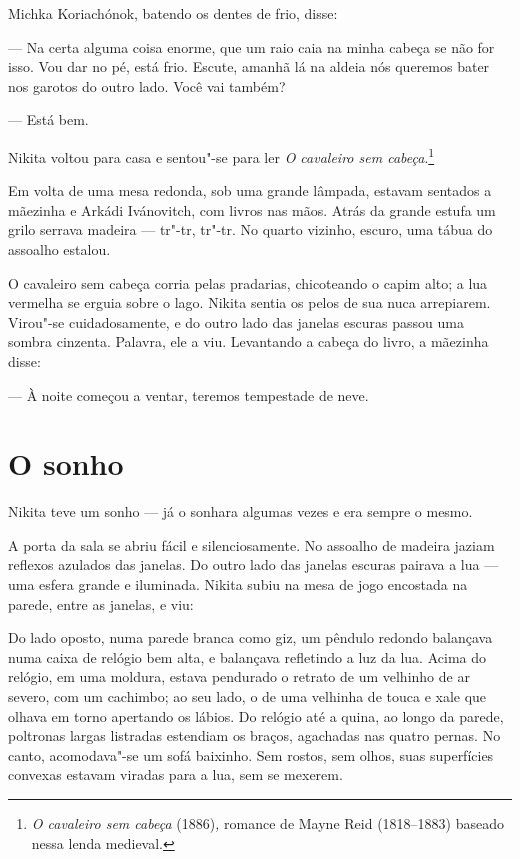 Michka Koriachónok, batendo os dentes de frio, disse:

--- Na certa alguma coisa enorme, que um raio caia na minha cabeça se
não for isso. Vou dar no pé, está frio. Escute, amanhã lá na aldeia nós queremos
bater nos garotos do outro lado. Você vai também?

--- Está bem.

Nikita voltou para casa e sentou"-se para ler \emph{O cavaleiro sem
cabeça}.\footnote{\emph{O cavaleiro sem cabeça} (1886)\emph{,} romance
  de Mayne Reid (1818--1883) baseado nessa lenda medieval.}

Em volta de uma mesa redonda, sob uma grande lâmpada, estavam sentados a
mãezinha e Arkádi Ivánovitch, com livros nas mãos. Atrás da grande
estufa um grilo serrava madeira --- tr"-tr, tr"-tr. No quarto vizinho,
escuro, uma tábua do assoalho estalou.

O cavaleiro sem cabeça corria pelas pradarias, chicoteando o capim alto;
a lua vermelha se erguia sobre o lago. Nikita sentia os pelos de sua
nuca arrepiarem. Virou"-se cuidadosamente, e do outro lado das janelas
escuras passou uma sombra cinzenta. Palavra, ele a viu. Levantando a
cabeça do livro, a mãezinha disse:

--- À noite começou a ventar, teremos tempestade de neve.

\chapter{O sonho}

Nikita teve um sonho --- já o sonhara algumas vezes e era sempre o
mesmo.

A porta da sala se abriu fácil e silenciosamente. No assoalho de madeira
jaziam reflexos azulados das janelas. Do outro lado das janelas
escuras pairava a lua --- uma esfera grande e iluminada. Nikita subiu na
mesa de jogo encostada na parede, entre as janelas, e viu:

Do lado oposto, numa parede branca como giz, um pêndulo redondo
balançava numa caixa de relógio bem alta, e balançava refletindo a luz
da lua. Acima do relógio, em uma moldura, estava pendurado o retrato de um
velhinho de ar severo, com um cachimbo; ao seu lado, o de uma velhinha
de touca e xale que olhava em torno apertando os lábios. Do relógio até a quina,
ao longo da parede, poltronas largas listradas estendiam os braços,
agachadas nas quatro pernas. No canto, acomodava"-se um sofá baixinho.
Sem rostos, sem olhos, suas superfícies convexas estavam viradas para a
lua, sem se mexerem.

